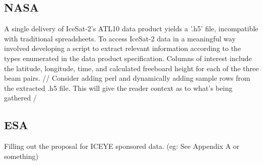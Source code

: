 \subsection*{NASA}
A single delivery of IceSat-2's ATL10 data product yields a '.h5' file, incompatible with traditional spreadsheets. To access IceSat-2 data in a meaningful way involved developing a script to extract relevant information according to the types enumerated in the data product specification. Columns of interest include the latitude, longitude, time, and calculated freeboard height for each of the three beam pairs.
// Consider adding perl and dynamically adding sample rows from the extracted .h5 file. This will give the reader context as to what's being gathered /


\subsection*{ESA}
Filling out the proposal for ICEYE sponsored data. (eg: See Appendix A or something)